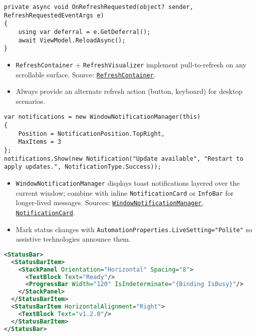 \begin{lstlisting}
private async void OnRefreshRequested(object? sender, RefreshRequestedEventArgs e)
{
    using var deferral = e.GetDeferral();
    await ViewModel.ReloadAsync();
}
\end{lstlisting}

\begin{itemize}
\tightlist
\item
  \passthrough{\lstinline!RefreshContainer!} +
  \passthrough{\lstinline!RefreshVisualizer!} implement pull-to-refresh
  on any scrollable surface. Source:
  \href{https://github.com/AvaloniaUI/Avalonia/blob/master/src/Avalonia.Controls/PullToRefresh/RefreshContainer.cs}{\passthrough{\lstinline!RefreshContainer!}}.
\item
  Always provide an alternate refresh action (button, keyboard) for
  desktop scenarios.
\end{itemize}

\begin{lstlisting}
var notifications = new WindowNotificationManager(this)
{
    Position = NotificationPosition.TopRight,
    MaxItems = 3
};
notifications.Show(new Notification("Update available", "Restart to apply updates.", NotificationType.Success));
\end{lstlisting}

\begin{itemize}
\tightlist
\item
  \passthrough{\lstinline!WindowNotificationManager!} displays toast
  notifications layered over the current window; combine with inline
  \passthrough{\lstinline!NotificationCard!} or
  \passthrough{\lstinline!InfoBar!} for longer-lived messages. Sources:
  \href{https://github.com/AvaloniaUI/Avalonia/blob/master/src/Avalonia.Controls/Notifications/WindowNotificationManager.cs}{\passthrough{\lstinline!WindowNotificationManager!}},
  \href{https://github.com/AvaloniaUI/Avalonia/blob/master/src/Avalonia.Controls/Notifications/NotificationCard.cs}{\passthrough{\lstinline!NotificationCard!}}.
\item
  Mark status changes with
  \passthrough{\lstinline!AutomationProperties.LiveSetting="Polite"!} so
  assistive technologies announce them.
\end{itemize}

\begin{lstlisting}[language=XML]
<StatusBar>
  <StatusBarItem>
    <StackPanel Orientation="Horizontal" Spacing="8">
      <TextBlock Text="Ready"/>
      <ProgressBar Width="120" IsIndeterminate="{Binding IsBusy}"/>
    </StackPanel>
  </StatusBarItem>
  <StatusBarItem HorizontalAlignment="Right">
    <TextBlock Text="v1.2.0"/>
  </StatusBarItem>
</StatusBar>
\end{lstlisting}

